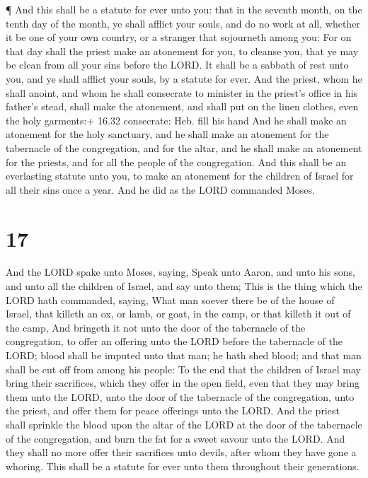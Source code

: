  ¶ And this shall be a statute for ever unto you: that in
the seventh month, on the tenth day of the month, ye shall afflict your
souls, and do no work at all, whether it be one of your own country, or
a stranger that sojourneth among you:  For on that day
shall the priest make an atonement for you, to cleanse you, that ye may
be clean from all your sins before the LORD.  It shall be a
sabbath of rest unto you, and ye shall afflict your souls, by a statute
for ever.  And the priest, whom he shall anoint, and whom
he shall consecrate to minister in the priest's office in his father's
stead, shall make the atonement, and shall put on the linen clothes,
even the holy garments:+ 16.32 consecrate: Heb. fill his hand
 And he shall make an atonement for the holy sanctuary, and
he shall make an atonement for the tabernacle of the congregation, and
for the altar, and he shall make an atonement for the priests, and for
all the people of the congregation.  And this shall be an
everlasting statute unto you, to make an atonement for the children of
Israel for all their sins once a year. And he did as the LORD commanded
Moses.

\hypertarget{section-16}{%
\section{17}\label{section-16}}

 And the LORD spake unto Moses, saying,  Speak
unto Aaron, and unto his sons, and unto all the children of Israel, and
say unto them; This is the thing which the LORD hath commanded, saying,
 What man soever there be of the house of Israel, that
killeth an ox, or lamb, or goat, in the camp, or that killeth it out of
the camp,  And bringeth it not unto the door of the
tabernacle of the congregation, to offer an offering unto the LORD
before the tabernacle of the LORD; blood shall be imputed unto that man;
he hath shed blood; and that man shall be cut off from among his people:
 To the end that the children of Israel may bring their
sacrifices, which they offer in the open field, even that they may bring
them unto the LORD, unto the door of the tabernacle of the congregation,
unto the priest, and offer them for peace offerings unto the LORD.
 And the priest shall sprinkle the blood upon the altar of
the LORD at the door of the tabernacle of the congregation, and burn the
fat for a sweet savour unto the LORD.  And they shall no
more offer their sacrifices unto devils, after whom they have gone a
whoring. This shall be a statute for ever unto them throughout their
generations.

